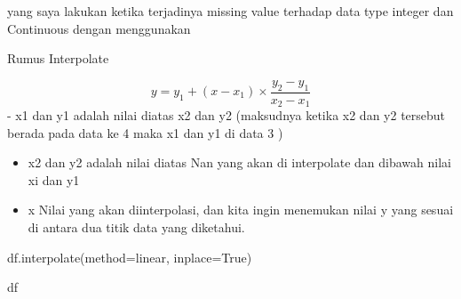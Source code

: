 \documentclass[
  letterpaper,
]{krantz}
\makeatletter
\newenvironment{Shaded}{\begin{snugshade}}{\end{snugshade}}
\newcommand{\NormalTok}[1]{\textcolor[rgb]{0.00,0.23,0.31}{#1}}
\newcommand{\OperatorTok}[1]{\textcolor[rgb]{0.37,0.37,0.37}{#1}}
\newcommand{\StringTok}[1]{\textcolor[rgb]{0.13,0.47,0.30}{#1}}
\newcommand{\VariableTok}[1]{\textcolor[rgb]{0.07,0.07,0.07}{#1}}
\newenvironment{kframe}{%
\medskip{}
\setlength{\fboxsep}{.8em}
 \def\at@end@of@kframe{}%
 \ifinner\ifhmode%
  \def\at@end@of@kframe{\end{minipage}}%
  \begin{minipage}{\columnwidth}%
 \fi\fi%
 \def\FrameCommand##1{\hskip\@totalleftmargin \hskip-\fboxsep
 \colorbox{shadecolor}{##1}\hskip-\fboxsep
     \hskip-\linewidth \hskip-\@totalleftmargin \hskip\columnwidth}%
 \MakeFramed {\advance\hsize-\width
   \@totalleftmargin\z@ \linewidth\hsize
   \@setminipage}}%
 {\par\unskip\endMakeFramed%
 \at@end@of@kframe}
\renewenvironment{Shaded}{\begin{kframe}}{\end{kframe}}
\makeatother
\begin{document}
yang saya lakukan ketika terjadinya missing value terhadap data type
integer dan Continuous dengan menggunakan

Rumus Interpolate

\[
y = y_1 + (x - x_1) \times \frac{{y_2 - y_1}}{{x_2 - x_1}}
\] - x1 dan y1 adalah nilai diatas x2 dan y2 (maksudnya ketika x2 dan y2
tersebut berada pada data ke 4 maka x1 dan y1 di data 3 )

\begin{itemize}
\item
  x2 dan y2 adalah nilai diatas Nan yang akan di interpolate dan dibawah
  nilai xi dan y1
\item
  x Nilai yang akan diinterpolasi, dan kita ingin menemukan nilai y yang
  sesuai di antara dua titik data yang diketahui.
\end{itemize}

\begin{Shaded}
\begin{Highlighting}[]
\NormalTok{df.interpolate(method}\OperatorTok{=}\StringTok{\textquotesingle{}linear\textquotesingle{}}\NormalTok{, inplace}\OperatorTok{=}\VariableTok{True}\NormalTok{)}

\NormalTok{df}
\end{Highlighting}
\end{Shaded}
\end{document}

